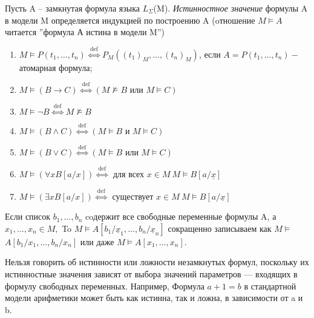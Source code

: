 \begin{definition}
	Пусть A -- замкнутая формула языка $L_{\Sigma }$(M). \textit{Истинностное значение} формулы A в модели M
	определяется индукцией по построению A (oтношение $ M \vDash A $ читается ''формула А истина в модели M'')
	\label{formula6}
	\begin{enumerate}
		\item $M \vDash P\left(t_{1}, \ldots, t_{n}\right) \stackrel{\text { def }}{\Longleftrightarrow}
			P_{M}\left(\left(t_{1}\right)_{M}, \ldots,\left(t_{n}\right)_{M}\right)$, если $A=P\left(t_{1},
			\ldots,t_{n}\right)-$ атомарная формула;
		\item  $M \vDash(B \rightarrow C) \stackrel{\text { def }}{\Longleftrightarrow}(M \nvDash B \text { или } M
			\vDash C)$
		\item $M \vDash \neg B \stackrel{\text { def }}{\Longleftrightarrow} M \nvDash B$ \\
		\item $M \vDash(B \wedge C) \stackrel{\text { def }}{\Longleftrightarrow}\left(M \vDash B \text{ и } M
			\vDash C\right)$
		\item $M \vDash(B \vee C) \stackrel{\text { def }}{\Longleftrightarrow}(M \vDash B \text { или } M \vDash
			C)$
		\item $M \vDash(\forall x B[a / x]) \stackrel{\text { def }}{\Longleftrightarrow}$ для всех $x \in M \ M
			\vDash B[a /\underline{x}]$
		\item $M \vDash(\exists x B[a / x]) \stackrel{\text { def }}{\Longleftrightarrow}$ существует $x \in M \ M
			\vDash B[a/ \underline{x}]$
	\end{enumerate}
	Если список $b_{1}, \ldots , b_{n}  $ coдержит все свободные переменные формулы A, а
	$x_{1}, \ldots, x_{n} \in M,$ To $M \vDash A\left[b_{1} / \underline{x}_{1}, \ldots, b_{n} /
	\underline{x}_{n}\right]$ сокращенно записываем как $M \vDash$
	$A\left[b_{1} / x_{1}, \ldots, b_{n} / x_{n}\right]$ или даже $M \vDash A\left[x_{1}, \ldots, x_{n}\right]$.

\end{definition}
\begin{remark}
	Нельзя говорить об истинности или ложности незамкнутых формул, поскольку их истинностные значения зависят от выбора
	значений параметров — входящих в формулу свободных переменных. Например, Формула $a+1 = b$  в стандартной
	модели арифметики может быть как истинна, так и ложна, в зависимости от a и b.
\end{remark}
